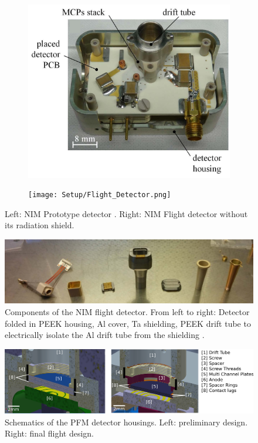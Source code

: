 	\begin{figure}[h!] %
		\begin{subfigure}{0.5\textwidth}
			\centering
			\includegraphics[width=\textwidth]{Setup/Prototype_Detector.png}
		\end{subfigure}
		\begin{subfigure}{0.5\textwidth}
			\centering
			\texttt{[image: Setup/Flight\_Detector.png]}
		\end{subfigure}
		\caption{Left: NIM Prototype detector \cite{Diss_Meyer}. Right: NIM Flight detector without its radiation shield.}
		\label{fig:DetPhotos}
	\end{figure}
	\begin{figure}[h!]
		\centering
		\includegraphics[width=\textwidth]{Setup/PFM_Det_Shield.jpg}
		\caption{Components of the NIM flight detector. From left to right: Detector folded in PEEK housing, Al cover, Ta shielding, PEEK drift tube to electrically isolate the Al drift tube from the shielding \cite{Lasi_2017_Detector}.}
		\label{fig:DetShield}
	\end{figure}
	\begin{figure}[h] %
		\centering
		\includegraphics[width= \textwidth]{Setup/PFMDetectors.png}
		\caption{Schematics of the PFM detector housings. Left: preliminary design. Right: final flight design.}
		\label{fig:FlightDetSchemata}
	\end{figure}
